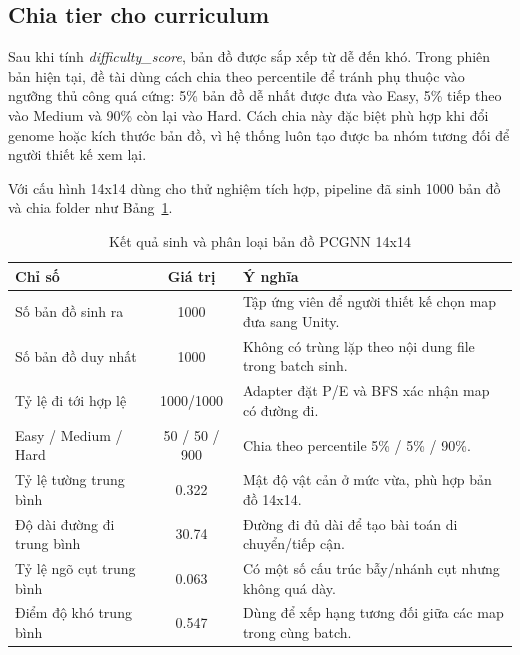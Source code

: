 \subsection{Chia tier cho curriculum}

Sau khi tính \emph{difficulty\_score}, bản đồ được sắp xếp từ dễ đến khó. Trong phiên bản hiện tại, đề tài dùng cách chia theo percentile để tránh phụ thuộc vào ngưỡng thủ công quá cứng: 5\% bản đồ dễ nhất được đưa vào Easy, 5\% tiếp theo vào Medium và 90\% còn lại vào Hard. Cách chia này đặc biệt phù hợp khi đổi genome hoặc kích thước bản đồ, vì hệ thống luôn tạo được ba nhóm tương đối để người thiết kế xem lại.

Với cấu hình 14x14 dùng cho thử nghiệm tích hợp, pipeline đã sinh 1000 bản đồ và chia folder như Bảng~\ref{tab:pcgnn_map_generation_summary}.

\begin{table}[H]
    \centering
    \small
    \caption{Kết quả sinh và phân loại bản đồ PCGNN 14x14}
    \label{tab:pcgnn_map_generation_summary}
    \begin{tabular}{|p{5cm}|c|p{6.7cm}|}
        \hline
        \textbf{Chỉ số} & \textbf{Giá trị} & \textbf{Ý nghĩa} \\
        \hline
        Số bản đồ sinh ra & 1000 & Tập ứng viên để người thiết kế chọn map đưa sang Unity. \\
        \hline
        Số bản đồ duy nhất & 1000 & Không có trùng lặp theo nội dung file trong batch sinh. \\
        \hline
        Tỷ lệ đi tới hợp lệ & 1000/1000 & Adapter đặt P/E và BFS xác nhận map có đường đi. \\
        \hline
        Easy / Medium / Hard & 50 / 50 / 900 & Chia theo percentile 5\% / 5\% / 90\%. \\
        \hline
        Tỷ lệ tường trung bình & 0.322 & Mật độ vật cản ở mức vừa, phù hợp bản đồ 14x14. \\
        \hline
        Độ dài đường đi trung bình & 30.74 & Đường đi đủ dài để tạo bài toán di chuyển/tiếp cận. \\
        \hline
        Tỷ lệ ngõ cụt trung bình & 0.063 & Có một số cấu trúc bẫy/nhánh cụt nhưng không quá dày. \\
        \hline
        Điểm độ khó trung bình & 0.547 & Dùng để xếp hạng tương đối giữa các map trong cùng batch. \\
        \hline
    \end{tabular}
\end{table}

